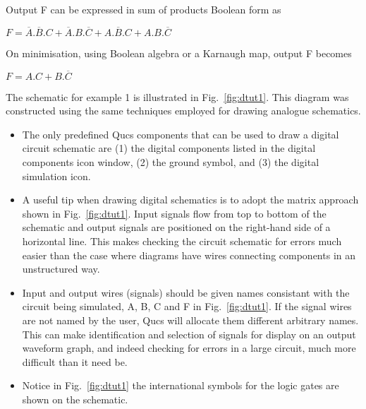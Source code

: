 \begin{flushleft}
Output F can be expressed in sum of products Boolean form as
\end{flushleft}
\begin{center}
\begin{large}

$F = \overline{A}.\overline{B}.C + \overline{A}.B.\overline{C}+A.\overline{B}.C+A.B.\overline{C}$\end{large}
\end{center}

\begin{flushleft}
On minimisation, using Boolean algebra or a Karnaugh map, output F becomes
\end{flushleft}
\begin{center}
\begin{large}$F=A.C+B.\overline{C}$\end{large}
\end{center}
The schematic for example 1 is illustrated in Fig.~\ref{fig:dtut1}.
This diagram was constructed using the same techniques employed for
drawing analogue schematics.


\begin{itemize}
\item
The only predefined Qucs components that can be used to draw a digital
circuit schematic are (1) the digital components listed in the digital
components icon window, (2) the ground symbol, and (3) the digital
simulation icon.
\item
A useful tip when drawing digital schematics is to adopt the matrix
approach shown in Fig.~\ref{fig:dtut1}. Input signals flow from top to
bottom of the schematic and output signals are positioned on the
right-hand side of a horizontal line. This makes checking the circuit
schematic for errors much easier than the case where diagrams have
wires connecting components in an unstructured way.
\item
Input and output wires (signals) should be given names consistant with
the circuit being simulated, A, B, C and F in Fig.~\ref{fig:dtut1}.
If the signal wires are not named by the user, Qucs will allocate them
different arbitrary names.  This can make identification and selection
of signals for display on an output waveform graph, and indeed
checking for errors in a large circuit, much more difficult than it
need be.
\item
Notice in Fig.~\ref{fig:dtut1} the international symbols for the logic
gates are shown on the schematic.
\end{itemize}

